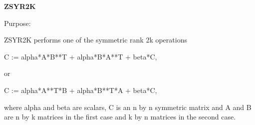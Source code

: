 {\bfseries Z\+S\+Y\+R2\+K} 

\begin{DoxyParagraph}{Purpose\+: }
\begin{DoxyVerb} ZSYR2K  performs one of the symmetric rank 2k operations

    C := alpha*A*B**T + alpha*B*A**T + beta*C,

 or

    C := alpha*A**T*B + alpha*B**T*A + beta*C,

 where  alpha and beta  are scalars,  C is an  n by n symmetric matrix
 and  A and B  are  n by k  matrices  in the  first  case  and  k by n
 matrices in the second case.\end{DoxyVerb}
 
\end{DoxyParagraph}


